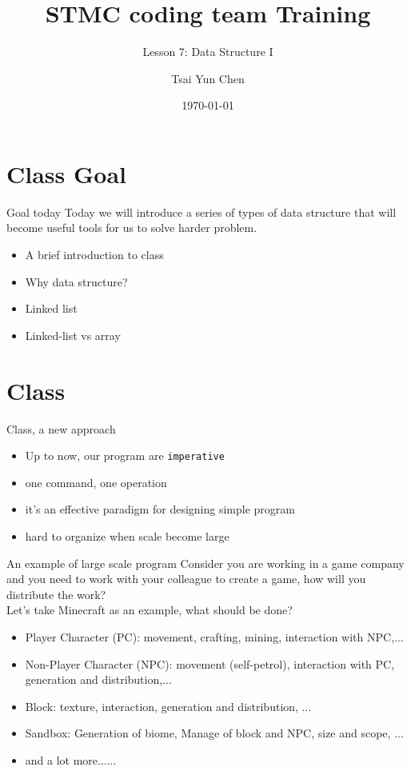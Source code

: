 \documentclass[10pt,xcolor={table,dvipsnames},t]{beamer}
\title[Your Short Title]{STMC coding team Training}
\subtitle{Lesson 7: Data Structure I}
\author{Tsai Yun Chen}
\date{\today}
\begin{document}
\begin{frame}
  \titlepage
\end{frame}


\section{Class Goal}

\begin{frame}{Goal today}
Today we will introduce a series of types of data structure that will become useful tools for us to solve harder problem.
\begin{itemize}
  \item A brief introduction to class
  \item Why data structure?
  \item Linked list
  \item Linked-list vs array
\end{itemize}

\end{frame}

\section{Class}
\begin{frame}{Class, a new approach}
  \begin{itemize}
    \item Up to now, our program are \texttt{imperative}
    \item one command, one operation
    \item it's an effective paradigm for designing simple program
    \item hard to organize when scale become large
  \end{itemize}
\end{frame}

\begin{frame}{An example of large scale program}
  Consider you are working in a game company and you need to work with your colleague to create a game, how will you distribute the work?\\
  Let's take Minecraft as an example, what should be done?
  \begin{itemize}
    \item Player Character (PC): movement, crafting, mining, interaction with NPC,...
    \item Non-Player Character (NPC): movement (self-petrol), interaction with PC, generation and distribution,...
    \item Block: texture, interaction, generation and distribution, ...
    \item Sandbox: Generation of biome, Manage of block and NPC, size and scope, ...
    \item and a lot more......
  \end{itemize}
\end{frame}
\end{document}
